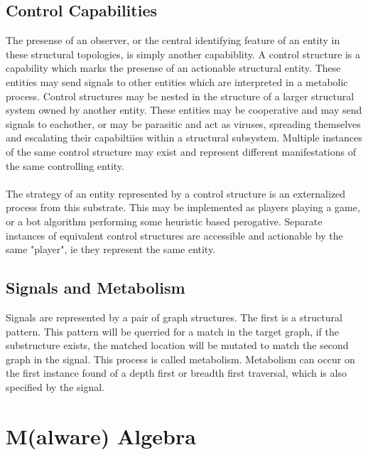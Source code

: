 \documentclass{article}
\begin{document}
	\subsection{Control Capabilities}
	The presense of an observer, or the central identifying feature of an entity in these structural topologies, is simply another capabiblity. A control structure is a capability which marks the presense of an actionable structural entity. These entities may send signals to other entities which are interpreted in a metabolic process. Control structures may be nested in the structure of a larger structural system owned by another entity. These entities may be cooperative and may send signals to eachother, or may be parasitic and act as viruses, spreading themselves and escalating their capabiltiies within a structural subsystem. Multiple instances of the same control structure may exist and represent different manifestations of the same controlling entity.\\\\
	The strategy of an entity represented by a control structure is an externalized process from this substrate. This may be implemented as players playing a game, or a bot algorithm performing some heuristic based perogative. Separate instances of equivalent control structures are accessible and actionable by the same "player", ie they represent the same entity.
	\subsection{Signals and Metabolism}
	Signals are represented by a pair of graph structures. The first is a structural pattern. This pattern will be querried for a match in the target graph, if the substructure exists, the matched location will be mutated to match the second graph in the signal. This process is called metabolism. Metabolism can occur on the first instance found of a depth first or breadth first traversal, which is also specified by the signal. 
	\section{M(alware) Algebra}
\end{document}
